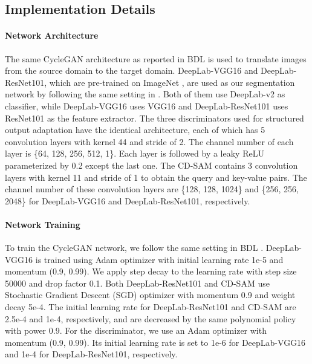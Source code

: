 \documentclass[10pt,twocolumn,letterpaper]{article}
\begin{document}
	\subsection{Implementation Details}
	\paragraph{Network Architecture}

	The same CycleGAN architecture \cite{zhu2017unpaired} as reported in BDL \cite{li2019bidirectional} is used to translate images from the source domain to the target domain. DeepLab-VGG16 and DeepLab-ResNet101, which are pre-trained on ImageNet \cite{deng2009imagenet}, are used as our segmentation network by following the same setting in \cite{tsai2018learning}. Both of them use DeepLab-v2 \cite{chen2018deeplab} as classifier, while DeepLab-VGG16 uses VGG16 \cite{simonyan2014very} and DeepLab-ResNet101 uses ResNet101 \cite{he2016deep} as the feature extractor. The three discriminators used for structured output adaptation have the identical architecture, each of which has 5 convolution layers with kernel 44 and stride of 2. The channel number of each layer is \{64, 128, 256, 512, 1\}. Each layer is followed by a leaky ReLU \cite{maas2013rectifier} parameterized by 0.2 except the last one. The CD-SAM contains 3 convolution layers with kernel 11 and stride of 1 to obtain the query and key-value pairs. The channel number of these convolution layers are \{128, 128, 1024\} and \{256, 256, 2048\} for DeepLab-VGG16 and DeepLab-ResNet101, respectively.


	\paragraph{Network Training}

	To train the CycleGAN network, we follow the same setting in BDL \cite{li2019bidirectional}. DeepLab-VGG16 is trained using Adam optimizer with initial learning rate 1e-5 and momentum (0.9, 0.99). We apply step decay to the learning rate with step size 50000 and drop factor 0.1. Both DeepLab-ResNet101 and CD-SAM use Stochastic Gradient Descent (SGD) optimizer with momentum 0.9 and weight decay 5e-4. The initial learning rate for DeepLab-ResNet101 and CD-SAM are 2.5e-4 and 1e-4, respectively, and are decreased by the same polynomial policy with power 0.9. For the discriminator, we use an Adam optimizer with momentum (0.9, 0.99). Its initial learning rate is set to 1e-6 for DeepLab-VGG16 and 1e-4 for DeepLab-ResNet101, respectively.
\end{document}
